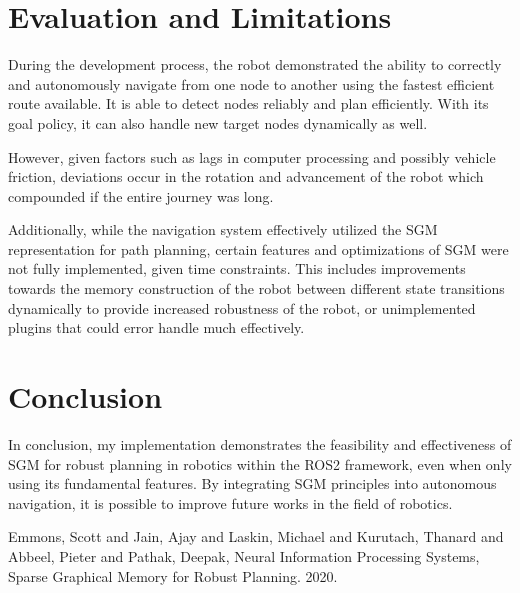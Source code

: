 \documentclass[conference]{IEEEtran}
\begin{document}
\section{Evaluation and Limitations}
During the development process, the robot demonstrated the ability to correctly and autonomously navigate from one node to another using the fastest efficient route available. It is able to detect nodes reliably and plan efficiently. With its goal policy, it can also handle new target nodes dynamically as well.

However, given factors such as lags in computer processing and possibly vehicle friction, deviations occur in the rotation and advancement of the robot which compounded if the entire journey was long.

Additionally, while the navigation system effectively utilized the SGM representation for path planning, certain features and optimizations of SGM were not fully implemented, given time constraints. This includes improvements towards the memory construction of the robot between different state transitions dynamically to provide increased robustness of the robot, or unimplemented plugins that could error handle much effectively.

\section{Conclusion}
In conclusion, my implementation demonstrates the feasibility and effectiveness of SGM for robust planning in robotics within the ROS2 framework, even when only using its fundamental features. By integrating SGM principles into autonomous navigation, it is possible to improve future works in the field of robotics.

\begin{thebibliography}{00}
   Emmons, Scott and Jain, Ajay and   Laskin, Michael and Kurutach, Thanard   and Abbeel, Pieter and Pathak, Deepak, Neural Information Processing Systems, Sparse Graphical Memory for Robust Planning. 2020.

\end{thebibliography}
\end{document}
